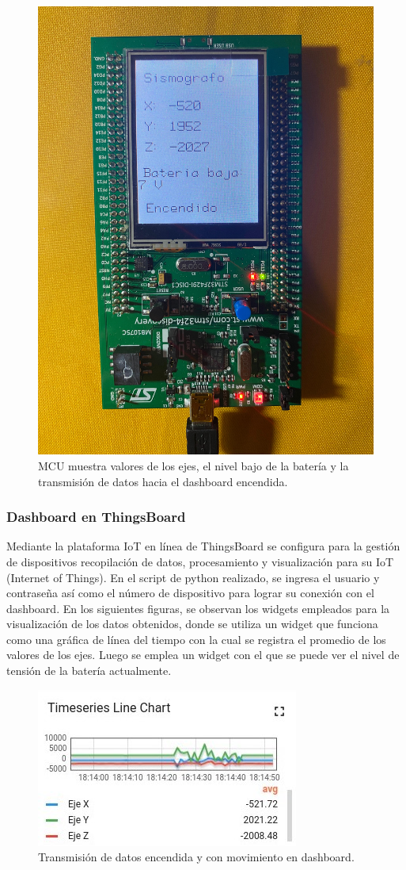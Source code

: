 \begin{figure}[H]
        \centering
        \includegraphics[width=0.5\linewidth]{fotos/bate_baja_encendido.jpeg}
        \caption{MCU muestra valores de los ejes, el nivel bajo de la batería y la transmisión de datos hacia el dashboard encendida.}
        \label{bate_baja_encendido}
    \end{figure}

\subsubsection{Dashboard en ThingsBoard}

Mediante la plataforma IoT en línea de ThingsBoard se configura para la gestión de dispositivos recopilación de datos, procesamiento y visualización para su IoT (Internet of Things). En el script de python realizado, se ingresa el usuario y contraseña así como el número de dispositivo para lograr su conexión con el dashboard. En los siguientes figuras, se observan los widgets empleados para la visualización de los datos obtenidos, donde se utiliza un widget que funciona como una gráfica de línea del tiempo con la cual se registra el promedio de los valores de los ejes. Luego se emplea un widget con el que se puede ver el nivel de tensión de la batería actualmente.

\begin{figure}[H]
        \centering
        \includegraphics[width=0.5\linewidth]{fotos/temblor.jpg}
        \caption{Transmisión de datos encendida y con movimiento en dashboard.}
        \label{temblor}
    \end{figure}


